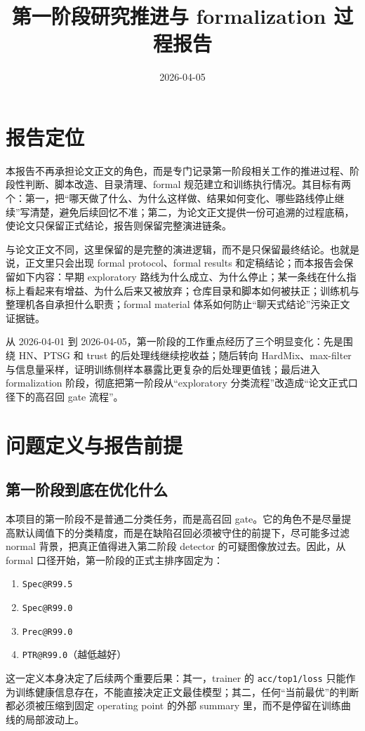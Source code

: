 \documentclass[UTF8,12pt]{ctexart}
\title{第一阶段研究推进与 formalization 过程报告}
\author{\TODO{填写作者姓名}}
\date{2026-04-05}
\begin{document}
\songti
\maketitle
\tableofcontents

\section{报告定位}
本报告不再承担论文正文的角色，而是专门记录第一阶段相关工作的推进过程、阶段性判断、脚本改造、目录清理、formal 规范建立和训练执行情况。其目标有两个：第一，把“哪天做了什么、为什么这样做、结果如何变化、哪些路线停止继续”写清楚，避免后续回忆不准；第二，为论文正文提供一份可追溯的过程底稿，使论文只保留正式结论，报告则保留完整演进链条。

与论文正文不同，这里保留的是完整的演进逻辑，而不是只保留最终结论。也就是说，正文里只会出现 formal protocol、formal results 和定稿结论；而本报告会保留如下内容：早期 exploratory 路线为什么成立、为什么停止；某一条线在什么指标上看起来有增益、为什么后来又被放弃；仓库目录和脚本如何被扶正；训练机与整理机各自承担什么职责；formal material 体系如何防止“聊天式结论”污染正文证据链。

从 2026-04-01 到 2026-04-05，第一阶段的工作重点经历了三个明显变化：先是围绕 HN、PTSG 和 trust 的后处理线继续挖收益；随后转向 HardMix、max-filter 与信息量采样，证明训练侧样本暴露比更复杂的后处理更值钱；最后进入 formalization 阶段，彻底把第一阶段从“exploratory 分类流程”改造成“论文正式口径下的高召回 gate 流程”。

\section{问题定义与报告前提}
\subsection{第一阶段到底在优化什么}
本项目的第一阶段不是普通二分类任务，而是高召回 gate。它的角色不是尽量提高默认阈值下的分类精度，而是在缺陷召回必须被守住的前提下，尽可能多过滤 normal 背景，把真正值得进入第二阶段 detector 的可疑图像放过去。因此，从 formal 口径开始，第一阶段的正式主排序固定为：
\begin{enumerate}[label=\arabic*.]
    \item \texttt{Spec@R99.5}
    \item \texttt{Spec@R99.0}
    \item \texttt{Prec@R99.0}
    \item \texttt{PTR@R99.0}（越低越好）
\end{enumerate}
这一定义本身决定了后续两个重要后果：其一，trainer 的 \texttt{acc/top1/loss} 只能作为训练健康信息存在，不能直接决定正文最佳模型；其二，任何“当前最优”的判断都必须被压缩到固定 operating point 的外部 summary 里，而不是停留在训练曲线的局部波动上。
\end{document}
